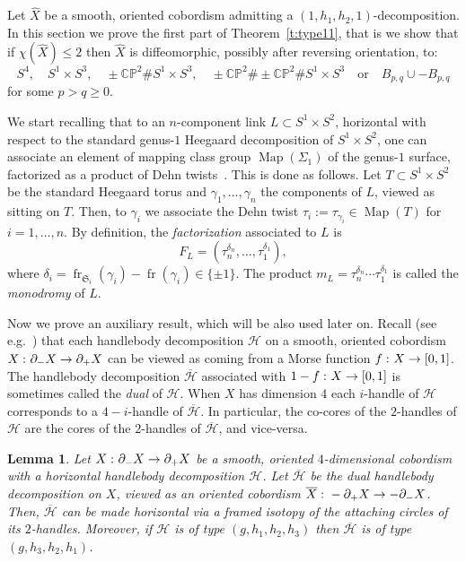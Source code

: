 \documentclass[11pt,a4paper]{amsart}
\newcommand{\CP}{\mathbb{CP}}
\newcommand{\fS}{\mathfrak{S}}
\newcommand{\de}{\delta}
\newcommand{\ga}{\gamma}
\newcommand{\Si}{\Sigma}
\newcommand{\x}{\times}
\newcommand{\del}{\partial}
\renewcommand{\H}{\mathcal H}
\newcommand{\co}{\thinspace\colon}
\DeclareMathOperator{\fr}{fr}
\DeclareMathOperator{\Map}{Map}
\newtheorem{lemma}[thm]{Lemma}
\theoremstyle{definition}
\numberwithin{equation}{section}
\begin{document}
Let $\hat X$ be a smooth, oriented cobordism  
admitting a $(1,h_1,h_2,1)$-decomposition. In this section we prove the first 
part of Theorem~\ref{t:type11}, that is we show that if  
$\chi(\hat X)\leq 2$ then $\hat X$ is diffeomorphic, possibly after 
reversing orientation, to: 
\[
S^4,\quad S^1\x S^3,\quad \pm\CP^2\#S^1\x S^3,\quad \pm\CP^2\#\pm\CP^2\#S^1\x S^3
\quad\text{or}\quad B_{p,q}\cup -B_{p,q} 
\]
for some $p>q\geq 0$.

We start recalling that to an $n$-component link $L\subset S^1\x S^2$, horizontal 
with respect to the standard genus-$1$ Heegaard decomposition of $S^1\x S^2$, one can associate 
an element of mapping class group $\Map(\Si_1)$ of the genus-$1$ surface, factorized as a product 
of Dehn twists~\cite[\S 1]{LP22-2}. This is done as follows.  
Let $T\subset S^1\x S^2$ be the standard Heegaard torus and $\ga_1,\ldots, \ga_n$
the components of $L$, viewed as sitting on $T$. Then, to $\ga_i$ we associate 
the Dehn twist $\tau_i := \tau_{\ga_i}\in \Map(T)$ for $i=1,\ldots, n$. 
By definition, the {\em factorization} associated to $L$ is 
\[
F_L = (\tau_n^{\de_n},\ldots,\tau_1^{\de_1}), 
\]
where $\de_i = \fr_{\fS_i}(\ga_i) - \fr(\ga_i)\in\{\pm 1\}$. 
The product $m_L = \tau_n^{\de_n}\cdots\tau_1^{\de_1}$ is called the {\em monodromy} of $L$. 

Now we prove an auxiliary result, which will be also used later on. 
Recall (see e.g.~\cite[Section~1.2]{Sc22}) that each handlebody decomposition $\H$ 
on a smooth, oriented cobordism $X\co\del_- X\to\del_+ X$ can be viewed as coming 
from a Morse function $f\co X\to [0,1]$. The handlebody decomposition $\overline{\H}$ 
associated with $1-f\co X\to [0,1]$ is sometimes called the {\em dual} of $\H$. 
When $X$ has dimension $4$ each $i$-handle of $\H$ corresponds to a $4-i$-handle of 
$\overline{\H}$. In particular, the co-cores of the $2$-handles of $\H$ are the 
cores of the $2$-handles of $\overline{\H}$, and vice-versa. 

\begin{lemma}\label{l:upside-down}
Let $X\co\del_- X\to \del_+ X$ be a smooth, oriented $4$-dimensional cobordism 
with a horizontal handlebody decomposition $\H$. Let $\overline{\H}$ be the dual 
handlebody decomposition on $X$, viewed as an oriented cobordism 
$\overline{X}\co -\del_+ X\to -\del_- X$. Then, $\overline{\H}$ can be made horizontal 
via a framed isotopy of the attaching circles of its $2$-handles. Moreover, if $\H$ 
is of type $(g,h_1,h_2,h_3)$ then $\overline{\H}$ is of type $(g,h_3,h_2,h_1)$. 
\end{lemma}
\end{document}
